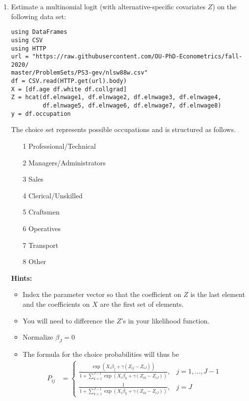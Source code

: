 \documentclass[12pt,english]{article}
\begin{document}
\begin{enumerate}
\item Estimate a multinomial logit (with alternative-specific covariates $Z$) on the following data set:

\begin{verbatim}
using DataFrames
using CSV
using HTTP
url = "https://raw.githubusercontent.com/OU-PhD-Econometrics/fall-2020/
master/ProblemSets/PS3-gev/nlsw88w.csv"
df = CSV.read(HTTP.get(url).body)
X = [df.age df.white df.collgrad]
Z = hcat(df.elnwage1, df.elnwage2, df.elnwage3, df.elnwage4, 
         df.elnwage5, df.elnwage6, df.elnwage7, df.elnwage8)
y = df.occupation
\end{verbatim}

The choice set represents possible occupations and is structured  as follows.

\begin{enumerate}
    \item[1] Professional/Technical 
    \item[2] Managers/Administrators
    \item[3] Sales                  
    \item[4] Clerical/Unskilled     
    \item[5] Craftsmen              
    \item[6] Operatives             
    \item[7] Transport              
    \item[8] Other                  
\end{enumerate}

\textbf{Hints:} 
\begin{itemize}
    \item Index the parameter vector so that the coefficient on $Z$ is the last element and the coefficients on $X$ are the first set of elements.
    \item You will need to difference the $Z$'s in your likelihood function. 
    \item Normalize $\beta_J = 0$
    \item The formula for the choice probabilities will thus be
    \begin{align*}
        P_{ij} &= \begin{cases} \frac{\exp\left(X_{i}\beta_j + \gamma(Z_{ij}-Z_{iJ})\right)}{1+\sum_{k=1}^{J-1}\exp\left(X_{i}\beta_k + \gamma(Z_{ik}-Z_{iJ})\right)} ,& j=1,\ldots,J-1\\
         \frac{1}{1+\sum_{k=1}^{J-1}\exp\left(X_{i}\beta_k + \gamma(Z_{ik}-Z_{iJ})\right)} ,& j=J
         \end{cases}
    \end{align*}
\end{itemize}


\end{enumerate}
\end{document}
